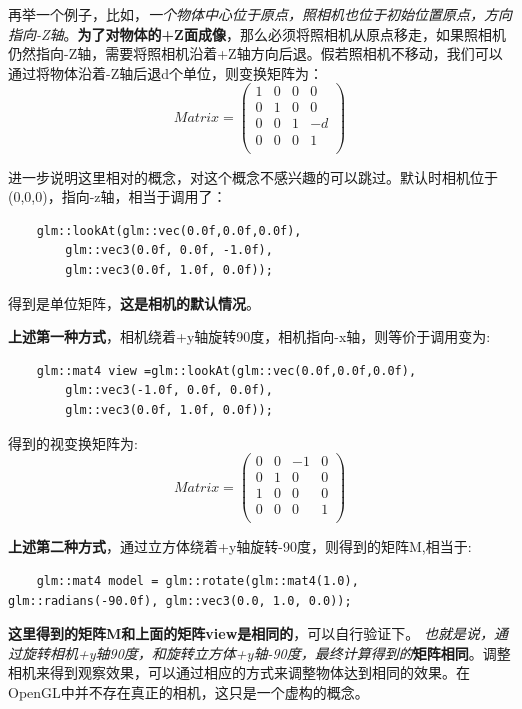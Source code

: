 \documentclass[UTF8,a4paper,12pt]{ctexbook}
\begin{document}
				再举一个例子，比如，\textit{一个物体中心位于原点，照相机也位于初始位置原点，方向指向-Z轴}。\textbf{为了对物体的+Z面成像}，那么必须将照相机从原点移走，如果照相机仍然指向-Z轴，需要将照相机沿着+Z轴方向后退。假若照相机不移动，我们可以通过将物体沿着-Z轴后退d个单位，则变换矩阵为：
					$$
					Matrix = 
					\left(
					\begin{array}{cccc}
					1 & 0 & 0& 0\\
					
					0 & 1 & 0& 0\\
					
					0 & 0 & 1& -d\\
					
					0 & 0 & 0& 1\\
					\end{array}
					\right)
					$$
					
			进一步说明这里相对的概念，对这个概念不感兴趣的可以跳过。默认时相机位于(0,0,0)，指向-z轴，相当于调用了：
			\begin{lstlisting}
	glm::lookAt(glm::vec(0.0f,0.0f,0.0f),
		glm::vec3(0.0f, 0.0f, -1.0f),
		glm::vec3(0.0f, 1.0f, 0.0f));
			\end{lstlisting}
			得到是单位矩阵，\textbf{这是相机的默认情况}。
			
			\textbf{上述第一种方式}，相机绕着+y轴旋转90度，相机指向-x轴，则等价于调用变为:
			\begin{lstlisting}
	glm::mat4 view =glm::lookAt(glm::vec(0.0f,0.0f,0.0f),
		glm::vec3(-1.0f, 0.0f, 0.0f),
		glm::vec3(0.0f, 1.0f, 0.0f));
			\end{lstlisting}
			得到的视变换矩阵为:
				$$
				Matrix = 
				\left(
				\begin{array}{cccc}
				0 & 0 & -1& 0\\
				
				0 & 1 & 0& 0\\
				
				1 & 0 & 0& 0\\
				
				0 & 0 & 0& 1\\
				\end{array}
				\right)
				$$
			
			\textbf{上述第二种方式}，通过立方体绕着+y轴旋转-90度，则得到的矩阵M,相当于:
				\begin{lstlisting}
	glm::mat4 model = glm::rotate(glm::mat4(1.0), glm::radians(-90.0f), glm::vec3(0.0, 1.0, 0.0));
				\end{lstlisting}
				
			\textbf{这里得到的矩阵M和上面的矩阵view是相同的}，可以自行验证下。 
			\textit{也就是说，通过旋转相机+y轴90度，和旋转立方体+y轴-90度，最终计算得到的}\textbf{矩阵相同}。调整相机来得到观察效果，可以通过相应的方式来调整物体达到相同的效果。在OpenGL中并不存在真正的相机，这只是一个虚构的概念。
			
\end{document}
